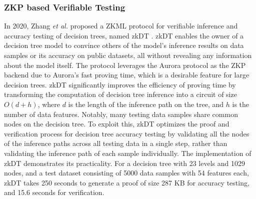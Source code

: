 \documentclass[journal]{IEEEtran}
\begin{document}
\subsubsection{\bf ZKP based Verifiable Testing}\label{sss:3b}



In 2020, Zhang \emph{et al.} proposed a ZKML protocol for verifiable inference and accuracy testing of decision trees, named zkDT \cite{zhang2020zero}. zkDT enables the owner of a decision tree model to convince others of the model's inference results on data samples or its accuracy on public datasets, all without revealing any information about the model itself. The protocol leverages the Aurora protocol \cite{ben2019aurora} as the ZKP backend due to Aurora's fast proving time, which is a desirable feature for large decision trees. zkDT significantly improves the efficiency of proving time by transforming the computation of decision tree inference into a circuit of size $O(d + h)$, where $d$ is the length of the inference path on the tree, and $h$ is the number of data features. Notably, many testing data samples share common nodes on the decision tree. To exploit this, zkDT optimizes the proof and verification process for decision tree accuracy testing by validating all the nodes of the inference paths across all testing data in a single step, rather than validating the inference path of each sample individually. The implementation of zkDT demonstrates its practicality. For a decision tree with 23 levels and 1029 nodes, and a test dataset consisting of 5000 data samples with 54 features each, zkDT takes 250 seconds to generate a proof of size 287 KB for accuracy testing, and 15.6 seconds for verification.
\end{document}
